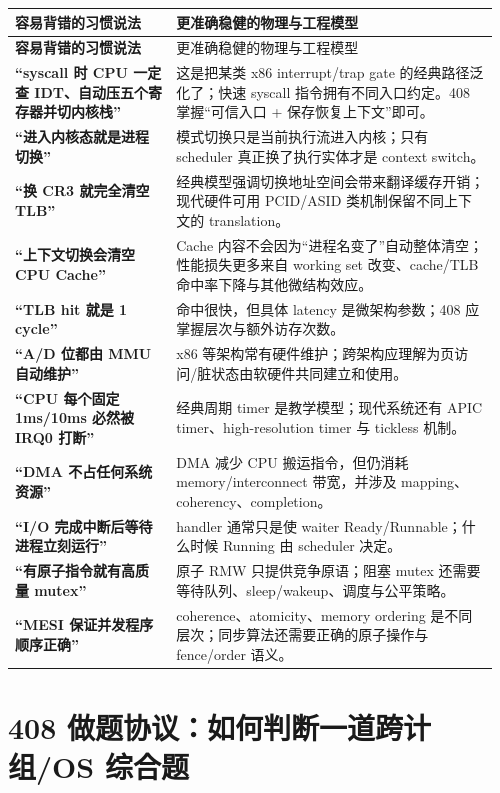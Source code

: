 \documentclass[11pt,a4paper]{ctexart}
\begin{document}
\begingroup
\small
\renewcommand{\arraystretch}{1.25}
\begin{longtable}{>{\bfseries}p{0.32\linewidth} p{0.64\linewidth}}
\toprule
容易背错的习惯说法 & 更准确稳健的物理与工程模型\\
\midrule
\endfirsthead
\toprule
容易背错的习惯说法 & 更准确稳健的物理与工程模型\\
\midrule
\endhead
“syscall 时 CPU 一定查 IDT、自动压五个寄存器并切内核栈” & 这是把某类 x86 interrupt/trap gate 的经典路径泛化了；快速 syscall 指令拥有不同入口约定。408 掌握“可信入口 + 保存恢复上下文”即可。\\
“进入内核态就是进程切换” & 模式切换只是当前执行流进入内核；只有 scheduler 真正换了执行实体才是 context switch。\\
“换 CR3 就完全清空 TLB” & 经典模型强调切换地址空间会带来翻译缓存开销；现代硬件可用 PCID/ASID 类机制保留不同上下文的 translation。\\
“上下文切换会清空 CPU Cache” & Cache 内容不会因为“进程名变了”自动整体清空；性能损失更多来自 working set 改变、cache/TLB 命中率下降与其他微结构效应。\\
“TLB hit 就是 1 cycle” & 命中很快，但具体 latency 是微架构参数；408 应掌握层次与额外访存次数。\\
“A/D 位都由 MMU 自动维护” & x86 等架构常有硬件维护；跨架构应理解为页访问/脏状态由软硬件共同建立和使用。\\
“CPU 每个固定 1ms/10ms 必然被 IRQ0 打断” & 经典周期 timer 是教学模型；现代系统还有 APIC timer、high-resolution timer 与 tickless 机制。\\
“DMA 不占任何系统资源” & DMA 减少 CPU 搬运指令，但仍消耗 memory/interconnect 带宽，并涉及 mapping、coherency、completion。\\
“I/O 完成中断后等待进程立刻运行” & handler 通常只是使 waiter Ready/Runnable；什么时候 Running 由 scheduler 决定。\\
“有原子指令就有高质量 mutex” & 原子 RMW 只提供竞争原语；阻塞 mutex 还需要等待队列、sleep/wakeup、调度与公平策略。\\
“MESI 保证并发程序顺序正确” & coherence、atomicity、memory ordering 是不同层次；同步算法还需要正确的原子操作与 fence/order 语义。\\
\bottomrule
\end{longtable}
\endgroup

\section{408 做题协议：如何判断一道跨计组/OS 综合题}
\end{document}
